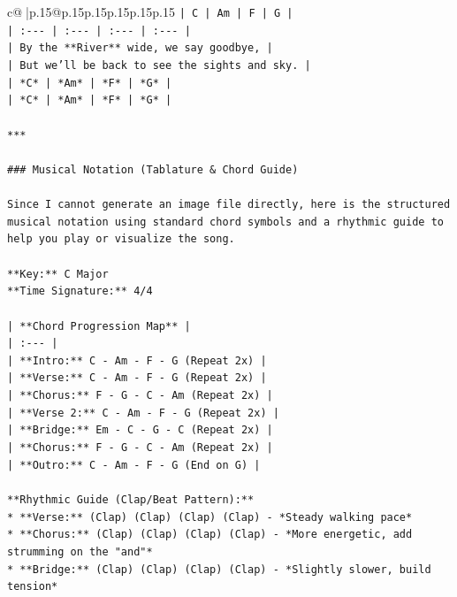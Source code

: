\documentclass{article}
\begin{document}
{\begin{supertabular}{c@{$\;$}|p{.15\linewidth}@{}p{.15\linewidth}p{.15\linewidth}p{.15\linewidth}p{.15\linewidth}p{.15\linewidth}}
{{{\texttt{| C | Am | F | G |} \\
\texttt{| :{-}{-}{-} | :{-}{-}{-} | :{-}{-}{-} | :{-}{-}{-} |} \\
\texttt{| By the **River** wide, we say goodbye, |} \\
\texttt{| But we'll be back to see the sights and sky. |} \\
\texttt{| *C* | *Am* | *F* | *G* |} \\
\texttt{| *C* | *Am* | *F* | *G* |} \\
\\ 
\texttt{***} \\
\\ 
\texttt{\#\#\# Musical Notation (Tablature \& Chord Guide)} \\
\\ 
\texttt{Since I cannot generate an image file directly, here is the structured musical notation using standard chord symbols and a rhythmic guide to help you play or visualize the song.} \\
\\ 
\texttt{**Key:** C Major} \\
\texttt{**Time Signature:** 4/4} \\
\\ 
\texttt{| **Chord Progression Map** |} \\
\texttt{| :{-}{-}{-} |} \\
\texttt{| **Intro:** C {-} Am {-} F {-} G (Repeat 2x) |} \\
\texttt{| **Verse:** C {-} Am {-} F {-} G (Repeat 2x) |} \\
\texttt{| **Chorus:** F {-} G {-} C {-} Am (Repeat 2x) |} \\
\texttt{| **Verse 2:** C {-} Am {-} F {-} G (Repeat 2x) |} \\
\texttt{| **Bridge:** Em {-} C {-} G {-} C (Repeat 2x) |} \\
\texttt{| **Chorus:** F {-} G {-} C {-} Am (Repeat 2x) |} \\
\texttt{| **Outro:** C {-} Am {-} F {-} G (End on G) |} \\
\\ 
\texttt{**Rhythmic Guide (Clap/Beat Pattern):**} \\
\texttt{*   **Verse:** (Clap) (Clap) (Clap) (Clap) {-} *Steady walking pace*} \\
\texttt{*   **Chorus:** (Clap) (Clap) (Clap) (Clap) {-} *More energetic, add strumming on the "and"*} \\
\texttt{*   **Bridge:** (Clap) (Clap) (Clap) (Clap) {-} *Slightly slower, build tension*} \\
}}}
\end{supertabular}}
\end{document}
